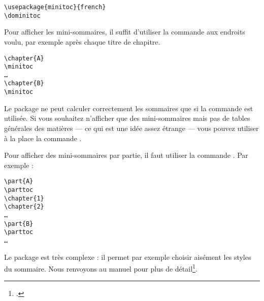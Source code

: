 \begin{verbatim}
\usepackage{minitoc}{french}
\dominitoc
\end{verbatim}

Pour afficher les mini-sommaires, il suffit d'utiliser la commande  aux endroits voulu, par exemple après chaque titre de chapitre.

\begin{verbatim}
\chapter{A}
\minitoc
…
\chapter{B}
\minitoc
\end{verbatim}

\begin{attention}
Le package ne peut calculer correctement les sommaires que si la commande  est utilisée. Si vous souhaitez n'afficher que des mini-sommaires mais pas de tables générales des matières --- ce qui est une idée assez étrange --- vous pouvez utiliser à la place la commande .
\end{attention}

Pour afficher des mini-sommaires par partie, il faut utiliser la commande . Par exemple :

\begin{verbatim}
\part{A}
\parttoc
\chapter{1}
\chapter{2}
…
\part{B}
\parttoc
…
\end{verbatim}


Le package  est très complexe : il permet par exemple choisir aisément les styles du sommaire. Nous renvoyons au manuel pour plus de détail\footcites{minitoc}[en particulier][]{minitoc_typesetting}.

